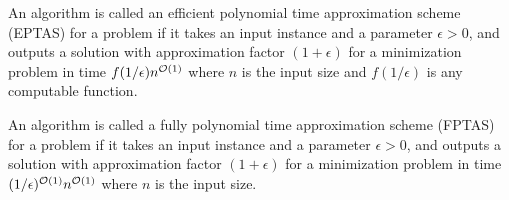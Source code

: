\begin{definition} 
    An algorithm is called an efficient polynomial time approximation scheme (EPTAS) for a problem if it takes an input instance and a parameter $\epsilon > 0$, and outputs a solution with approximation factor $(1+\epsilon)$ for a minimization problem in time $f(1/\epsilon)n^{\mathcal{O}(1)}$ where $n$ is the input size and $f(1/\epsilon)$ is any computable function.
\end{definition}

\begin{definition} 
    An algorithm is called a fully polynomial time approximation scheme (FPTAS) for a problem if it takes an input instance and a parameter $\epsilon > 0$, and outputs a solution with approximation factor $(1+\epsilon)$ for a minimization problem in time $(1/\epsilon)^{\mathcal{O}(1)}n^{\mathcal{O}(1)}$ where $n$ is the input size.
\end{definition}


